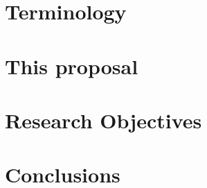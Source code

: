 \documentclass[10pt,twocolumn]{article}
\author{Tome Levy\\
	Department of Computer Science\\
	Technion---Israel Institute of Technology\\
	\texttt{\small \href{mailto:stlevy@campus.technion.ac.il}{stlevy@campus.technion.ac.il}}}
\date{\small Advisor: Prof.\ Yossi Gil}
\begin{document}
\maketitle
  
\begin{abstract}
	 
\end{abstract}

\section{Terminology}


\section{This proposal}
\label{Section:proposal}


\section{Research Objectives}
\label{Section:objectives}
%

\section{Conclusions}
\label{Section:zz}



%

\end{document}
